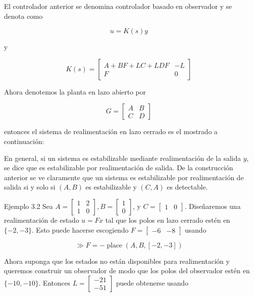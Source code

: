 El controlador anterior se denomina controlador basado en observador y se denota como

$$
u=K(s) y
$$

y

$$
K(s)=\left[\begin{array}{c|c}
A+B F+L C+L D F & -L \\
\hline F & 0
\end{array}\right]
$$

Ahora denotemos la planta en lazo abierto por

$$
G=\left[\begin{array}{c|c}
A & B \\
\hline C & D
\end{array}\right]
$$

entonces el sistema de realimentación en lazo cerrado es el mostrado a continuación:


En general, si un sistema es estabilizable mediante realimentación de la salida $y$, se dice que es estabilizable por realimentación de salida. De la construcción anterior se ve claramente que un sistema es estabilizable por realimentación de salida si y solo si $(A, B)$ es estabilizable y $(C, A)$ es detectable.

Ejemplo 3.2 Sea $A=\left[\begin{array}{ll}1 & 2 \\ 1 & 0\end{array}\right], B=\left[\begin{array}{l}1 \\ 0\end{array}\right]$, y $C=\left[\begin{array}{ll}1 & 0\end{array}\right]$. Diseñaremos una realimentación de estado $u=F x$ tal que los polos en lazo cerrado estén en $\{-2,-3\}$. Esto puede hacerse escogiendo $F=\left[\begin{array}{ll}-6 & -8\end{array}\right]$ usando

$$
\gg F=-\operatorname{place}(A, B,[-2,-3])
$$

Ahora suponga que los estados no están disponibles para realimentación y queremos construir un observador de modo que los polos del observador estén en $\{-10,-10\}$. Entonces $L=\left[\begin{array}{l}-21 \\ -51\end{array}\right]$ puede obtenerse usando

